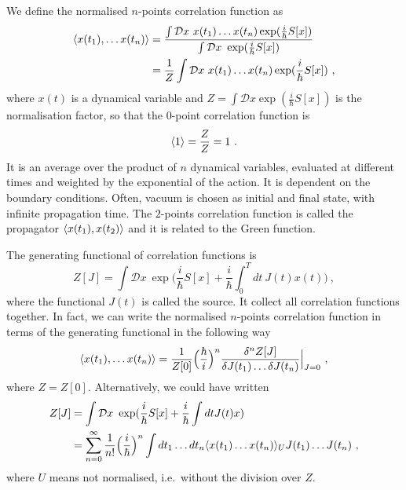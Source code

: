     We define the normalised $n$-points correlation function as 
    \begin{equation*}
    \begin{aligned}
        \langle x(t_1), \ldots x(t_n)\rangle & = \frac{\int \mathcal D x ~ x(t_1) \ldots x(t_n) \exp(\frac{i}{\hbar} S[x])}{\int \mathcal D x ~ \exp(\frac{i}{\hbar} S[x])} \\ & = \frac{1}{Z} \int \mathcal D x ~ x(t_1) \ldots x(t_n) \exp(\frac{i}{\hbar} S[x])~,
    \end{aligned}
    \end{equation*}
    where $x(t)$ is a dynamical variable and $Z = \int \mathcal D x \exp(\frac{i}{\hbar} S[x])$ is the normalisation factor, so that the $0$-point correlation function is 
    \begin{equation*}
        \langle1\rangle = \frac{Z}{Z} = 1 ~.
    \end{equation*}
    It is an average over the product of $n$ dynamical variables, evaluated at different times and weighted by the exponential of the action. It is dependent on the boundary conditions. Often, vacuum is chosen as initial and final state, with infinite propagation time. The $2$-points correlation function is called the propagator $\langle x(t_1), x(t_2)\rangle$ and it is related to the Green function.

    The generating functional of correlation functions is 
    \begin{equation*}
        Z[J] = \int \mathcal D x ~ \exp \Big(\frac{i}{\hbar} S[x] + \frac{i}{\hbar} \int_0^T dt ~ J(t) x(t) \Big) ~,
    \end{equation*}
    where the functional $J(t)$ is called the source. It collect all correlation functions together. In fact, we can write the normalised $n$-points correlation function in terms of the generating functional in the following way 
    \begin{equation*}
        \langle x(t_1), \ldots x(t_n)\rangle = \frac{1}{Z[0]} \Big ( \frac{\hbar}{i} \Big)^n \frac{\delta^n Z[J]}{\delta J (t_1) \ldots \delta J(t_n)} \Big \vert_{J=0} ~,
    \end{equation*}
    where $Z = Z[0]$. Alternatively, we could have written 
    \begin{equation*}
    \begin{aligned}
        Z[J] & = \int \mathcal D x ~ \exp(\frac{i}{\hbar} S[x] + \frac{i}{\hbar} \int dt J(t) x) \\ & = \sum_{n=0}^\infty \frac{1}{n!} \Big ( \frac{i}{\hbar} \Big)^n \int dt_1 \ldots dt_n \langle x(t_1) \ldots x(t_n)\rangle_U J(t_1) \ldots J(t_n) ~,
    \end{aligned}
    \end{equation*}
    where $U$ means not normalised, i.e.~without the division over $Z$.

